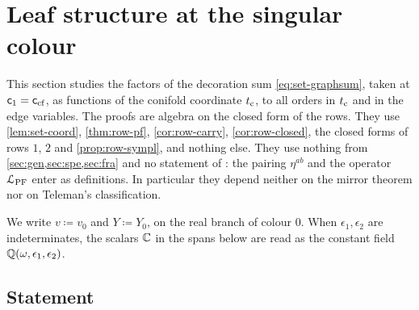 \section{Leaf structure at the singular colour}
\label{sec:lea}

This section studies the factors of the decoration sum \eqref{eq:set-graphsum}, taken at $\mathsf{c}_{1}=\mathsf{c}_{\mathrm{cf}}$, as functions of the conifold coordinate $t_{\mathrm{c}}$, to all orders in $t_{\mathrm{c}}$ and in the edge variables. The proofs are algebra on the closed form of the rows. They use \cref{lem:set-coord}, \cref{thm:row-pf}, \cref{cor:row-carry}, \cref{cor:row-closed}, the closed forms of rows $1$, $2$ and \cref{prop:row-sympl}, and nothing else. They use nothing from \cref{sec:gen,sec:spe,sec:fra} and no statement of \cite{BS}: the pairing $\eta^{ab}$ and the operator $\mathcal{L}_{\mathrm{PF}}$ enter as definitions. In particular they depend neither on the mirror theorem nor on Teleman's classification.

We write $v\coloneqq v_0$ and $Y\coloneqq Y_0$, on the real branch of colour $0$. When $\epsilon_1,\epsilon_2$ are indeterminates, the scalars $\mathbb{C}$ in the spans below are read as the constant field $\mathbb{Q}(\omega,\epsilon_1,\epsilon_2)$.

\subsection{Statement}


